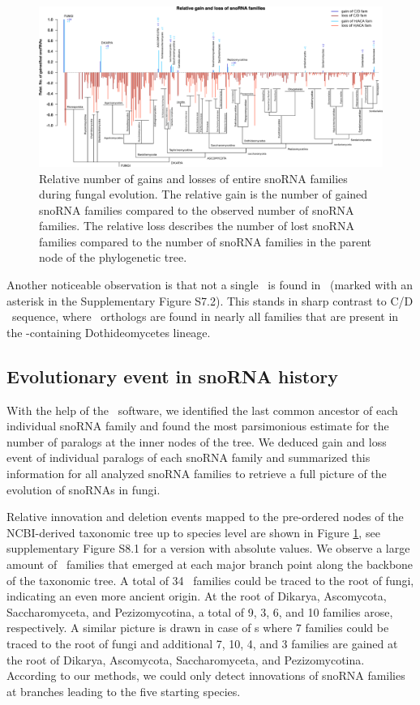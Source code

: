 \begin{figure}
  \centering
  \includegraphics[width=\textwidth]{pics/fungi_relative_gain_loss.eps}
  \caption{Relative number of gains and losses of entire snoRNA
    families during fungal evolution. The relative gain is the number
    of gained snoRNA families compared to the observed number of
    snoRNA families. The relative loss describes the number of lost
    snoRNA families compared to the number of snoRNA families in the
    parent node of the phylogenetic tree.}
\label{fig:relative_innovation_deletion_event}
\end{figure}

Another noticeable observation is that not a single \haca\ is found in
\Ptt\ (marked with an asterisk in the Supplementary Figure S7.2). This
stands in sharp contrast to C/D \sno\ sequence, where \ptt\ orthologs
are found in nearly all families that are present in the
\ptt-containing Dothideomycetes lineage.

\subsection{Evolutionary event in snoRNA history}

With the help of the \epope\ software, we identified the last common
ancestor of each individual snoRNA family and found the most
parsimonious estimate for the number of paralogs at the inner nodes of
the tree.  We deduced gain and loss event of individual paralogs of
each snoRNA family and summarized this information for all analyzed
snoRNA families to retrieve a full picture of the evolution of snoRNAs
in fungi.

Relative innovation and deletion events mapped to the pre-ordered
nodes of the NCBI-derived taxonomic tree up to species level are shown
in Figure \ref{fig:relative_innovation_deletion_event}, see
supplementary Figure S8.1 for a version with absolute values.  We
observe a large amount of \sno\ families that emerged at each major
branch point along the backbone of the taxonomic tree. A total of 34
\cd\ families could be traced to the root of fungi, indicating an even
more ancient origin. At the root of Dikarya, Ascomycota,
Saccharomyceta, and Pezizomycotina, a total of 9, 3, 6, and 10
families arose, respectively. A similar picture is drawn in case of
\haca s where 7 families could be traced to the root of fungi and
additional 7, 10, 4, and 3 families are gained at the root of Dikarya,
Ascomycota, Saccharomyceta, and Pezizomycotina.  According to our
methods, we could only detect innovations of snoRNA families at
branches leading to the five starting species.

